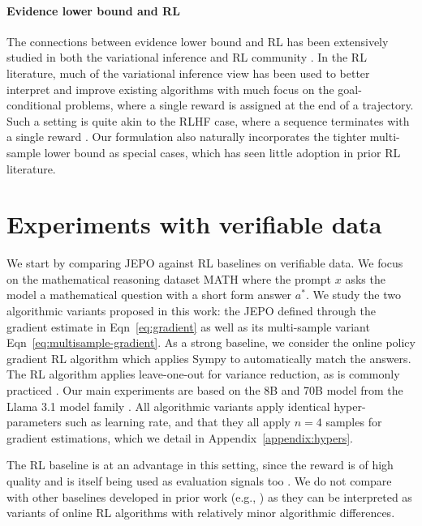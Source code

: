 \documentclass{article}
\theoremstyle{definition}
\begin{document}
\paragraph{Evidence lower bound and RL} The connections between evidence lower bound and RL has been extensively studied in both the variational inference \citep{ranganath2016hierarchical,blei2017variational} and RL community \citep{levine2018reinforcement,o2020making}. In the RL literature, much of the variational inference view has been used to better interpret and improve existing algorithms with much focus on the goal-conditional problems, where a single reward is assigned at the end of a trajectory. Such a setting is quite akin to the RLHF case, where a sequence terminates with a single reward \citep{andrychowicz2017hindsight,eysenbach2020rewriting,tang2021hindsight}. Our formulation also naturally incorporates the tighter multi-sample lower bound \citep{burda2015importance,rainforth2018tighter} as special cases, which has seen little adoption in prior RL literature.





\section{Experiments with verifiable data}\label{sec:exp-verifiable}

We start by comparing JEPO against RL baselines on verifiable data. We focus on the mathematical reasoning dataset MATH \citep{hendrycks2021measuring} where the prompt $x$ asks the model a mathematical question with a short form answer $a^*$. We study the two algorithmic variants proposed in this work: the JEPO defined through the gradient estimate in Eqn~\eqref{eq:gradient} as well as its multi-sample variant Eqn~\eqref{eq:multisample-gradient}. As a strong baseline, we consider 
the online policy gradient RL algorithm which applies Sympy \citep{10.7717/peerj-cs.103} to automatically match the answers. The RL algorithm applies leave-one-out for variance reduction, as is commonly practiced \citep{rloo,shao2024deepseekmath}. Our main experiments are based on the 8B and 70B model from the Llama 3.1 model family \citep{dubey2024llama}. All algorithmic variants apply identical hyper-parameters such as learning rate, and that they all apply $n=4$ samples for gradient estimations, which we detail in Appendix~\ref{appendix:hypers}.

The RL baseline is at an advantage in this setting, since the reward is of high quality and is itself being used as evaluation signals too \citep{yue2024harp}. We do not compare with other baselines developed in prior work (e.g., \citep{hoffman2024training}) as they can be interpreted as variants of online RL algorithms with relatively minor algorithmic differences.
\end{document}
